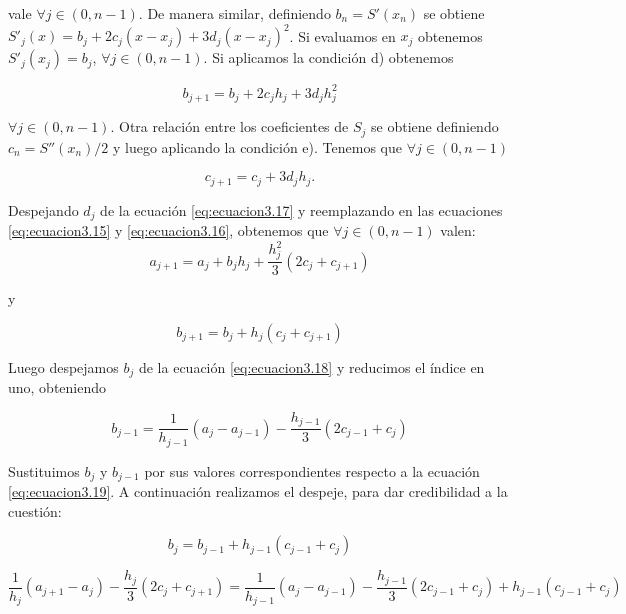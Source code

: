 vale $\forall j \in (0, n-1)$. De manera similar, definiendo $b_{n} = S'(x_{n})$ se obtiene $S'_{j}(x) = b_{j} + 2c_{j} (x - x_{j}) + 3d_{j} (x - x_{j})^{2}$.
Si evaluamos en $x_{j}$ obtenemos  $S'_{j}(x_{j}) = b_{j}$, $\forall j \in (0, n-1)$. Si aplicamos la condición d) obtenemos

\begin{equation} \label{eq:ecuacion3.16}
b_{j+1} = b_{j} + 2c_{j} h_{j} + 3d_{j} h_{j}^{2}
\end{equation}

$\forall j \in (0, n-1)$. Otra relación entre los coeficientes de $S_{j}$ se obtiene definiendo $c_{n} = S''(x_{n})/2$ y luego aplicando la condición e). Tenemos que $\forall j \in (0, n-1)$ 

\begin{equation} \label{eq:ecuacion3.17}
c_{j+1} = c_{j} + 3d_{j} h_{j}.
\end{equation}

Despejando $d_{j}$ de la ecuación \ref{eq:ecuacion3.17} y reemplazando en las ecuaciones \ref{eq:ecuacion3.15} y \ref{eq:ecuacion3.16}, obtenemos que $\forall j \in (0, n-1)$ valen:\\

\begin{equation} \label{eq:ecuacion3.18}
a_{j+1} = a_{j} + b_{j} h_{j} + \frac{h_{j}^{2}}{3} (2c_{j} + c_{j+1})
\end{equation}

y

\begin{equation} \label{eq:ecuacion3.19}
b_{j+1} = b_{j} + h_{j} (c_{j} + c_{j+1})
\end{equation}


Luego despejamos $b_{j}$ de la ecuación \ref{eq:ecuacion3.18} y reducimos el índice en uno, obteniendo 

\begin{equation} \label{eq:ecuacion3.20}
b_{j-1} = \frac{1}{h_{j-1}} (a_{j} - a_{j-1}) - \frac{h_{j-1}}{3} (2c_{j-1} + c_{j})                                
\end{equation}

Sustituimos $b_{j}$ y $b_{j-1}$ por sus valores correspondientes respecto a la ecuación \ref{eq:ecuacion3.19}. A continuación realizamos el despeje, para dar credibilidad a la cuestión:

$$b_{j} = b_{j-1} + h_{j-1} (c_{j-1} + c_{j})$$

$$\frac{1}{h_{j}} (a_{j+1} - a_{j}) - \frac{h_{j}}{3} (2c_{j} + c_{j+1}) = \frac{1}{h_{j-1}} (a_{j} - a_{j-1}) - \frac{h_{j-1}}{3} (2c_{j-1} + c_{j}) + h_{j-1} (c_{j-1} + c_{j})$$

